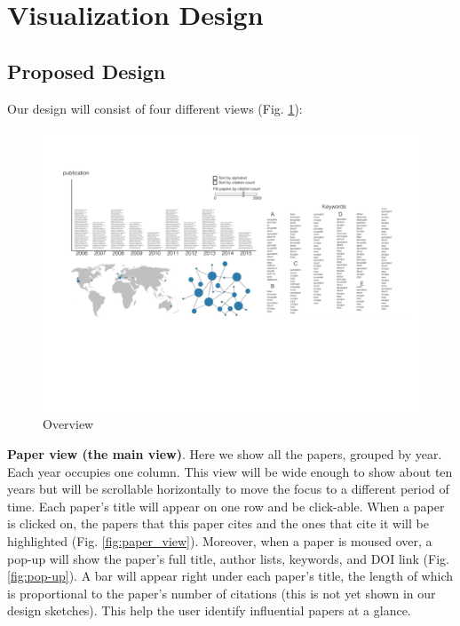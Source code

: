 \documentclass[12pt]{article}
\begin{document}
\section{Visualization Design}
\subsection{Proposed Design}
Our design will consist of four different views (Fig. \ref*{fig:overview}):

\begin{figure}[htb!]
    \centering
    \includegraphics[width=160mm]{visproposalDrawing_page_Part_1.pdf}
    \caption{Overview}
    \label{fig:overview}
\end{figure}

\textbf{Paper view (the main view)}. Here we show all the papers, grouped by year. Each year occupies one column. This view will be wide enough to show about ten years but will be scrollable horizontally to move the focus to a different period of time. Each paper's title will appear on one row and be click-able. When a paper is clicked on, the papers that this paper cites and the ones that cite it will be highlighted (Fig. \ref{fig:paper_view}). Moreover, when a paper is moused over, a pop-up will show the paper's full title, author lists, keywords, and DOI link (Fig. \ref{fig:pop-up}). A bar will appear right under each paper's title, the length of which is proportional to the paper's number of citations (this is not yet shown in our design sketches). This help the user identify influential papers at a glance.
\end{document}

